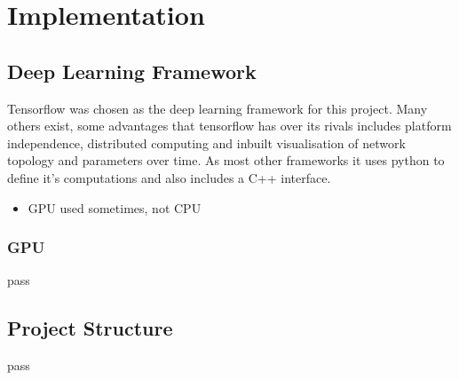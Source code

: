 \chapter{Implementation}
  \section{Deep Learning Framework}
    Tensorflow \cite{tensorflow} was chosen as the deep learning framework for this
    project. Many others exist, some advantages that tensorflow has over its rivals
    includes platform independence, distributed computing and inbuilt visualisation
    of network topology and parameters over time. As most other frameworks it uses python
    to define it's computations and also includes a C++ interface.
    \begin{itemize}
      \item GPU used sometimes, not CPU
    \end{itemize}
    \subsection{GPU} \label{sec:GPU}
      pass
  \section{Project Structure}
    pass
